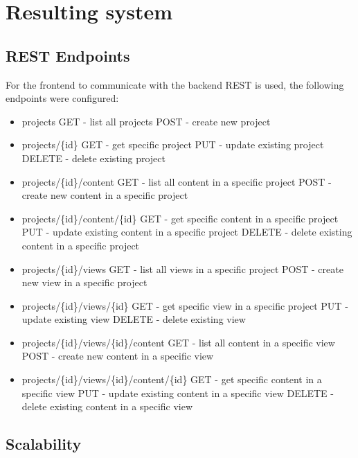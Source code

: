 \documentclass[a4paper,12pt]{article}
\begin{document}
\section{Resulting system}
\subsection{REST Endpoints}
For the frontend to communicate with the backend REST is used, the following endpoints were configured:

\begin{itemize}
  \item projects
      \subitem GET - list all projects
      \subitem POST - create new project
  \item projects/\{id\}
      \subitem GET - get specific project
      \subitem PUT - update existing project
      \subitem DELETE - delete existing project
  \item projects/\{id\}/content
      \subitem GET - list all content in a specific project
      \subitem POST - create new content in a specific project 
  \item projects/\{id\}/content/\{id\}
      \subitem GET - get specific content in a specific project
      \subitem PUT - update existing content in a specific project
      \subitem DELETE - delete existing content in a specific project

  \item projects/\{id\}/views
      \subitem GET - list all views in a specific project
      \subitem POST - create new view in a specific project 
  \item projects/\{id\}/views/\{id\}
      \subitem GET - get specific view in a specific project
      \subitem PUT - update existing view
      \subitem DELETE - delete existing view
  \item projects/\{id\}/views/\{id\}/content
      \subitem GET - list all content in a specific view
      \subitem POST - create new content in a specific view 
  \item projects/\{id\}/views/\{id\}/content/\{id\}
      \subitem GET - get specific content in a specific view
      \subitem PUT - update existing content in a specific view
      \subitem DELETE - delete existing content in a specific view
\end{itemize}

\subsection{Scalability}
\end{document}
